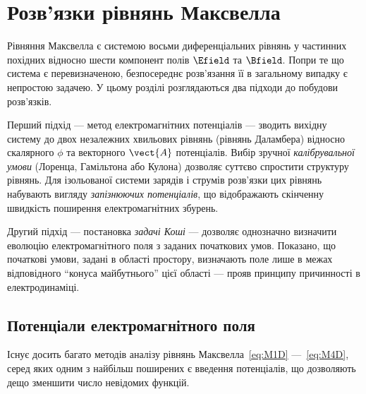 

\chapter{Розв'язки рівнянь Максвелла}\label{\currfilebase}

Рівняння Максвелла є системою восьми диференціальних рівнянь у частинних похідних відносно шести компонент
полів $\Efield$ та $\Bfield$. Попри те що система є перевизначеною, безпосереднє розв'язання її в загальному випадку є
непростою задачею. У цьому розділі розглядаються два підходи до побудови розв'язків.

Перший підхід --- метод електромагнітних потенціалів --- зводить вихідну систему до двох незалежних хвильових рівнянь
(рівнянь Даламбера) відносно скалярного $\phi$ та векторного $\vect{A}$ потенціалів. Вибір зручної \emph{калібрувальної
умови} (Лоренца, Гамільтона або Кулона) дозволяє суттєво спростити структуру рівнянь. Для ізольованої системи зарядів і
струмів розв'язки цих рівнянь набувають вигляду \emph{запізнюючих потенціалів}, що відображають скінченну швидкість
поширення електромагнітних збурень.

Другий підхід --- постановка \emph{задачі Коші} --- дозволяє однозначно визначити еволюцію електромагнітного поля з
заданих початкових умов. Показано, що початкові умови, задані в області простору, визначають поле лише в
межах відповідного \enquote{конуса майбутнього} цієї області --- прояв принципу причинності в електродинаміці.

\section{Потенціали електромагнітного поля}

Існує досить багато методів аналізу рівнянь Максвелла~\eqref{eq:M1D} ---~\eqref{eq:M4D}, серед яких одним з найбільш
поширених є введення потенціалів, що дозволяють дещо зменшити число невідомих функцій.

